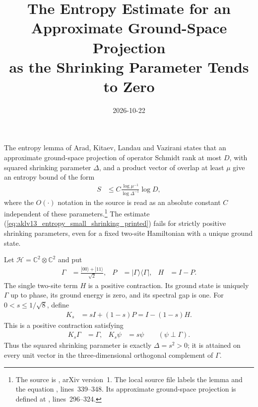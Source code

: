 \documentclass{article}
\title{The Entropy Estimate for an Approximate Ground-Space Projection\\
    as the Shrinking Parameter Tends to Zero}
\author{}
\date{2026-10-22}
\begin{document}
\maketitle
{}

The entropy lemma of Arad, Kitaev, Landau and Vazirani states that an approximate
ground-space projection of operator Schmidt rank at most $D$, with squared
shrinking parameter $\Delta$, and a product vector of overlap at least $\mu$
give an entropy bound of the form
\begin{align}
    S & \le C\frac{\log\mu^{-1}}{\log\Delta^{-1}}\log D,
    \label{eq:aklv13_entropy_small_shrinking_printed}
\end{align}
where the $O(\cdot)$ notation in the source is read as an absolute
constant $C$ independent of these parameters.\footnote{The source is
    \cite{Arad2013AreaLaw}, arXiv version~1.
    The local source file  labels the lemma
     and the equation , lines~339--348.
    Its approximate ground-space projection is defined at
    , lines~296--324.}
The estimate (\ref{eq:aklv13_entropy_small_shrinking_printed}) fails for
strictly positive shrinking parameters, even for a fixed two-site
Hamiltonian with a unique ground state.

Let $\mathcal H=\mathbb C^2\otimes\mathbb C^2$ and put
\begin{align}
    \Gamma & =\frac{|00\rangle+|11\rangle}{\sqrt2},
           & P                                      & =|\Gamma\rangle\langle\Gamma|,
           & H                                      & =I-P.
    \label{eq:aklv13_entropy_small_shrinking_bell_hamiltonian}
\end{align}
The single two-site term $H$ is a positive contraction. Its ground state is
uniquely $\Gamma$ up to phase, its ground energy is zero, and its spectral
gap is one. For $0<s\le1/\sqrt8$, define
\begin{align}
    K_s & =sI+(1-s)P=I-(1-s)H.
    \label{eq:aklv13_entropy_small_shrinking_agsp_family}
\end{align}
This is a positive contraction satisfying
\begin{align}
    K_s\Gamma & =\Gamma,
              & K_s\psi  & =s\psi\qquad(\psi\perp\Gamma).
    \label{eq:aklv13_entropy_small_shrinking_agsp_action}
\end{align}
Thus the squared shrinking parameter is exactly $\Delta=s^2>0$; it is
attained on every unit vector in the three-dimensional orthogonal
complement of $\Gamma$.
\end{document}
